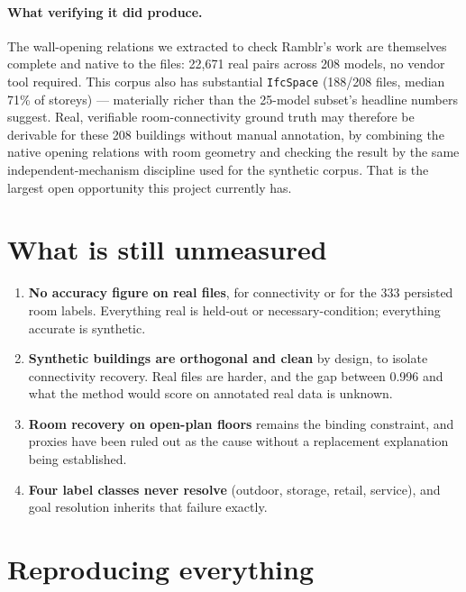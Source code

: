 \documentclass[11pt,a4paper]{article}
\begin{document}
\paragraph{What verifying it did produce.} The wall-opening relations we
extracted to check Ramblr's work are themselves complete and native to the
files: 22{,}671 real pairs across 208 models, no vendor tool required. This
corpus also has substantial \texttt{IfcSpace} (188/208 files, median 71\% of
storeys) --- materially richer than the 25-model subset's headline numbers
suggest. Real, verifiable room-connectivity ground truth may therefore be
derivable for these 208 buildings without manual annotation, by combining the
native opening relations with room geometry and checking the result by the same
independent-mechanism discipline used for the synthetic corpus. That is the
largest open opportunity this project currently has.

\section{What is still unmeasured}

\begin{enumerate}[leftmargin=*]
\item \textbf{No accuracy figure on real files}, for connectivity or for the
333 persisted room labels. Everything real is held-out or necessary-condition;
everything accurate is synthetic.
\item \textbf{Synthetic buildings are orthogonal and clean} by design, to
isolate connectivity recovery. Real files are harder, and the gap between
0.996 and what the method would score on annotated real data is unknown.
\item \textbf{Room recovery on open-plan floors} remains the binding
constraint, and proxies have been ruled out as the cause without a replacement
explanation being established.
\item \textbf{Four label classes never resolve} (outdoor, storage, retail,
service), and goal resolution inherits that failure exactly.
\end{enumerate}

\section{Reproducing everything}
\end{document}
